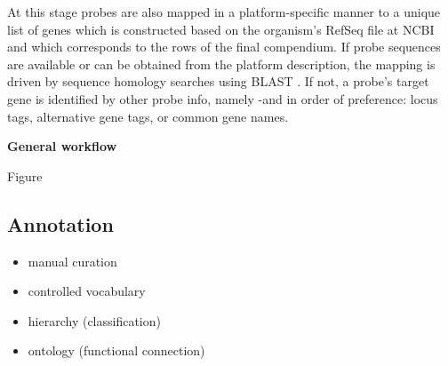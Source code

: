 At this stage probes are also mapped in a platform-specific manner to a unique 
list of genes which is constructed based on the organism's RefSeq file at NCBI 
\cite{Pruitt2007} and which corresponds to the rows of the final compendium. 
If probe sequences are available or can be obtained from the platform 
description, the mapping is driven by sequence homology searches using 
BLAST \cite{Altschul1997}. 
If not, a probe's target gene is identified by other probe info, namely -and in 
order of preference: locus tags, alternative gene tags, or common gene names.


\textbf{General workflow}

Figure


\subsection{Annotation}


\begin{itemize}
\item manual curation
\item controlled vocabulary
\item hierarchy (classification)
\item ontology (functional connection)
\end{itemize}



